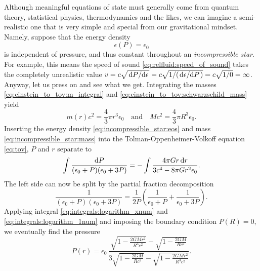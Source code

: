 Although meaningful equations of state must generally come from quantum theory, statistical physics, thermodynamics and the likes, we can imagine a semi-realistic one that is very simple and special from our gravitational mindset.
Namely, suppose that the energy density
\begin{equation}
	\epsilon(P) = \epsilon_0
\label{eq:incompressible_star:eos}
\end{equation}
is independent of pressure, and thus constant throughout an \emph{incompressible star}.
For example, this means the speed of sound \eqref{eq:relfluid:speed_of_sound} takes the completely unrealistic value $v = c \sqrt{\odv{P}/{\epsilon}} = c \sqrt{1/(\odv{\epsilon}/{P})} = c \sqrt{1/0} = \infty$.
Anyway, let us press on and see what we get.
Integrating the masses \eqref{eq:einstein_to_tov:m_integral} and \eqref{eq:einstein_to_tov:schwarzschild_mass} yield
\begin{equation}
	m(r) c^2 = \frac{4}{3} \pi r^3 \epsilon_0 
	\quad \text{and} \quad
	M c^2 = \frac{4}{3} \pi R^3 \epsilon_0 
	.
\label{eq:incompressible_star:mass}
\end{equation}
Inserting the energy density \eqref{eq:incompressible_star:eos} and mass \eqref{eq:incompressible_star:mass} into the Tolman-Oppenheimer-Volkoff equation \eqref{eq:tov}, $P$ and $r$ separate to
\begin{equation}
	\int \frac{\mathop{}\!\mathrm{d} P}{(\epsilon_0+P)(\epsilon_0+3P)} = - \int \frac{4 \pi G r \mathop{}\!\mathrm{d} r}{3 c^4 - 8\pi G r^2 \epsilon_0} .
\end{equation}
The left side can now be split by the partial fraction decomposition
\begin{equation}
	\frac{1}{(\epsilon_0+P)(\epsilon_0+3P)} = \frac{1}{2P} \left( \frac{1}{\epsilon_0+P} + \frac{1}{\epsilon_0+3P} \right) .
\end{equation}
Applying integral \eqref{eq:integrals:logarithm_xnum} and \eqref{eq:integrals:logarithm_1num} and imposing the boundary condition $P(R) = 0$, we eventually find the pressure
\begin{equation}
	P(r) = \epsilon_0 \, \frac{\sqrt{1-\frac{2GMr^2}{R^3c^2}} - \sqrt{1-\frac{2GM}{Rc^2}}}{3 \sqrt{1-\frac{2GM}{Rc^2}} - \sqrt{1-\frac{2GMr^2}{R^3c^2}}} .
	\label{eq:incompressible_star:pressure}
\end{equation}
